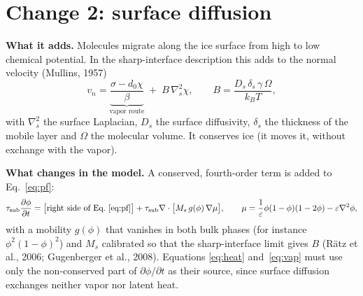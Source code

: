 \documentclass[11pt]{article}
\newcommand{\pd}[2]{\frac{\partial #1}{\partial #2}}
\begin{document}
\section{Change 2: surface diffusion}

\textbf{What it adds.} Molecules migrate along the ice surface from high to
low chemical potential. In the sharp-interface description this adds to the
normal velocity (Mullins, 1957)
\begin{equation}
v_n = \underbrace{\frac{\sigma - d_0\chi}{\beta}}_{\text{vapor route}} \;+\; B\,\nabla_s^{2}\chi ,
\qquad B = \frac{D_s\,\delta_s\,\gamma\,\Omega}{k_BT} ,
\label{eq:mullins}
\end{equation}
with $\nabla_s^{2}$ the surface Laplacian, $D_s$ the surface diffusivity,
$\delta_s$ the thickness of the mobile layer and $\Omega$ the molecular
volume. It conserves ice (it moves it, without exchange with the vapor).

\textbf{What changes in the model.} A conserved, fourth-order term is added
to Eq.~\eqref{eq:pf}:
\begin{equation}
\tau_{\mathrm{sub}}\pd{\phi}{t} = \big[\text{right side of Eq.~\eqref{eq:pf}}\big]
 + \tau_{\mathrm{sub}}\nabla\cdot\big[M_s\,g(\phi)\,\nabla\mu\big],
\qquad \mu = \frac{1}{\varepsilon}\phi(1-\phi)(1-2\phi) - \varepsilon\nabla^{2}\phi ,
\end{equation}
with a mobility $g(\phi)$ that vanishes in both bulk phases (for instance
$\phi^{2}(1-\phi)^{2}$) and $M_s$ calibrated so that the sharp-interface limit
gives $B$ (R\"atz et al., 2006; Gugenberger et al., 2008). Equations
\eqref{eq:heat} and~\eqref{eq:vap} must use only the non-conserved part of
$\partial\phi/\partial t$ as their source, since surface diffusion exchanges
neither vapor nor latent heat.
\end{document}
